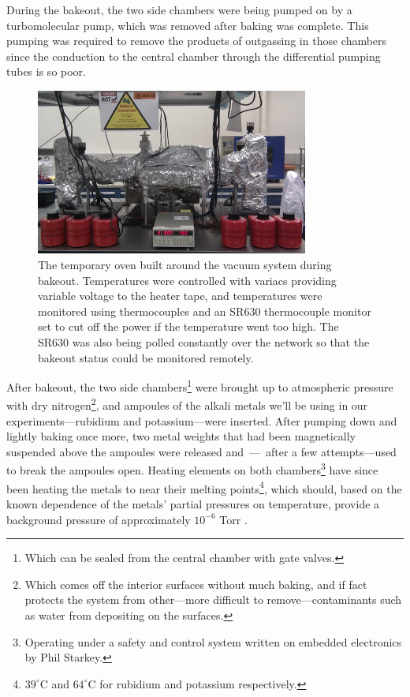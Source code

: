 During the bakeout, the two side chambers were being pumped on by a turbomolecular pump, which was removed after baking was complete. This pumping was required to remove the products of outgassing in those chambers since the conduction to the central chamber through the differential pumping tubes is so poor.

\begin{figure}
\begin{center}
\includegraphics[width=0.8\textwidth]{figures/unsorted/bakeout.png}
\caption{\label{fig:bakeout}The temporary oven built around the vacuum system during bakeout. Temperatures were controlled with variacs providing variable voltage to the heater tape, and temperatures were monitored using thermocouples and an \textsc{SR}630 thermocouple monitor set to cut off the power if the temperature went too high. The \textsc{SR}630 was also being polled constantly over the network so that the bakeout status could be monitored remotely.}
\end{center}
\end{figure}

After bakeout, the two side chambers\footnote{Which can be sealed from the central chamber with gate valves.} were brought up to atmospheric pressure with dry nitrogen\footnote{Which comes off the interior surfaces without much baking, and if fact protects the system from other---more difficult to remove---contaminants such as water from depositing on the surfaces.}, and ampoules of the alkali metals we'll be using in our experiments---rubidium and potassium---were inserted. After pumping down and lightly baking once more, two metal weights that had been magnetically suspended above the ampoules were released and~---~after a few attempts---used to break the ampoules open. Heating elements on both chambers\footnote{Operating under a safety and control system written on embedded electronics by Phil Starkey.} have since been heating the metals to near their melting points\footnote{$39^\circ$C and $64^\circ$C for rubidium and potassium respectively.}, which should, based on the known dependence of the metals' partial pressures on temperature, provide a background pressure of approximately $10^{-6}$ Torr \cite{steck_rubidium_2010, tiecke_properties_2011}.

